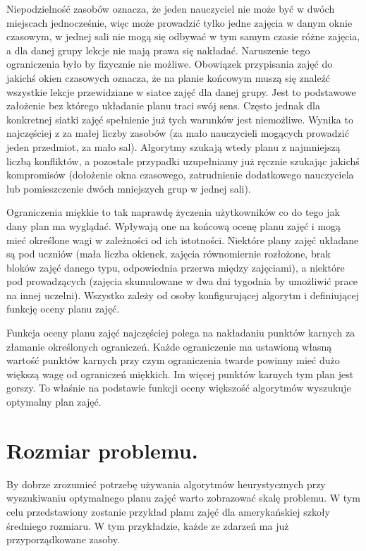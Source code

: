 Niepodzielność zasobów oznacza, że jeden nauczyciel nie może być w dwóch miejscach jednocześnie, więc może prowadzić tylko jedne zajęcia w danym oknie czasowym, w jednej sali nie mogą się odbywać w tym samym czasie różne zajęcia, a dla danej grupy lekcje nie mają prawa się nakładać. Naruszenie tego ograniczenia było by fizycznie nie możliwe. 
Obowiązek przypisania zajęć do jakichś okien czasowych oznacza, że na planie końcowym muszą się znaleźć wszystkie lekcje przewidziane w siatce zajęć dla danej grupy. Jest to podstawowe założenie bez którego układanie planu traci swój sens.
Często jednak dla konkretnej siatki zajęć spełnienie już tych warunków jest niemożliwe. Wynika to najczęściej z za małej liczby zasobów (za mało nauczycieli mogących prowadzić jeden przedmiot, za mało sal). Algorytmy szukają wtedy planu z najmniejszą liczbą konfliktów, a pozostałe przypadki uzupełniamy już ręcznie szukając jakichś kompromisów (dołożenie okna czasowego, zatrudnienie dodatkowego nauczyciela lub pomieszczenie dwóch mniejszych grup w jednej sali).

Ograniczenia miękkie to tak naprawdę życzenia użytkowników co do tego jak dany plan ma wyglądać. Wpływają one na końcową ocenę planu zajęć i mogą mieć określone wagi w zależności od ich istotności. Niektóre plany zajęć układane są pod uczniów (mała liczba okienek, zajęcia równomiernie rozłożone, brak bloków zajęć danego typu, odpowiednia przerwa między zajęciami), a niektóre pod prowadzących (zajęcia skumulowane w dwa dni tygodnia by umożliwić prace na innej uczelni). Wszystko zależy od osoby konfigurującej algorytm i definiującej funkcję oceny planu zajęć.

Funkcja oceny planu zajęć najczęściej polega na nakładaniu punktów karnych za złamanie określonych ograniczeń. Każde ograniczenie ma ustawioną własną wartość punktów karnych przy czym ograniczenia twarde powinny mieć dużo większą wagę od ograniczeń miękkich. Im więcej punktów karnych tym plan jest gorszy. To właśnie na podstawie funkcji oceny większość algorytmów wyszukuje optymalny plan zajęć.

\newpage
\section {Rozmiar problemu.}

By dobrze zrozumieć potrzebę używania algorytmów heurystycznych przy wyszukiwaniu optymalnego planu zajęć warto zobrazować skalę problemu. W tym celu przedstawiony zostanie przykład planu zajęć dla amerykańskiej szkoły średniego rozmiaru. W tym przykładzie, każde ze zdarzeń ma już przyporządkowane zasoby.

